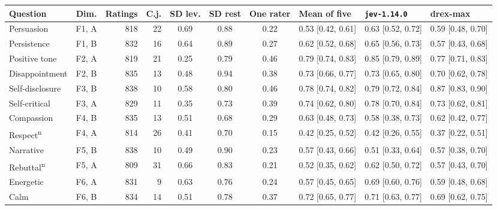 {\scriptsize\setlength{\tabcolsep}{2.4pt}
\begin{tabular}{@{}l c rr cc c l l l@{}}
\toprule
Question & Dim. & Ratings & C.j. & SD lev. & SD rest & One rater & Mean of five & \texttt{jev-1.14.0} & drex-max \\
\midrule
Persuasion & F1, A & 818 & 22 & 0.69 & 0.88 & 0.22 & 0.53 {\scriptsize[0.42, 0.61]} & 0.63 {\scriptsize[0.52, 0.72]} & 0.59 {\scriptsize[0.48, 0.70]} \\
Persistence & F1, B & 832 & 16 & 0.64 & 0.89 & 0.27 & 0.62 {\scriptsize[0.52, 0.68]} & 0.65 {\scriptsize[0.56, 0.73]} & 0.57 {\scriptsize[0.43, 0.68]} \\
Positive tone & F2, A & 819 & 21 & 0.25 & 0.79 & 0.46 & 0.79 {\scriptsize[0.74, 0.83]} & 0.85 {\scriptsize[0.79, 0.89]} & 0.77 {\scriptsize[0.71, 0.83]} \\
Disappointment & F2, B & 835 & 13 & 0.48 & 0.94 & 0.38 & 0.73 {\scriptsize[0.66, 0.77]} & 0.73 {\scriptsize[0.65, 0.80]} & 0.70 {\scriptsize[0.62, 0.78]} \\
Self-disclosure & F3, B & 838 & 10 & 0.58 & 0.80 & 0.46 & 0.78 {\scriptsize[0.74, 0.82]} & 0.79 {\scriptsize[0.72, 0.84]} & 0.87 {\scriptsize[0.83, 0.90]} \\
Self-critical & F3, A & 829 & 11 & 0.35 & 0.73 & 0.39 & 0.74 {\scriptsize[0.62, 0.80]} & 0.78 {\scriptsize[0.70, 0.84]} & 0.73 {\scriptsize[0.62, 0.81]} \\
Compassion & F4, B & 835 & 13 & 0.51 & 0.68 & 0.29 & 0.63 {\scriptsize[0.48, 0.73]} & 0.58 {\scriptsize[0.38, 0.73]} & 0.62 {\scriptsize[0.42, 0.77]} \\
Respect\textsuperscript{n} & F4, A & 814 & 26 & 0.41 & 0.70 & 0.15 & 0.42 {\scriptsize[0.25, 0.52]} & 0.42 {\scriptsize[0.26, 0.55]} & 0.37 {\scriptsize[0.22, 0.51]} \\
Narrative & F5, B & 838 & 10 & 0.49 & 0.90 & 0.23 & 0.57 {\scriptsize[0.43, 0.66]} & 0.51 {\scriptsize[0.33, 0.64]} & 0.57 {\scriptsize[0.38, 0.70]} \\
Rebuttal\textsuperscript{n} & F5, A & 809 & 31 & 0.66 & 0.83 & 0.21 & 0.52 {\scriptsize[0.35, 0.62]} & 0.62 {\scriptsize[0.50, 0.72]} & 0.57 {\scriptsize[0.43, 0.70]} \\
Energetic & F6, A & 831 & 9 & 0.63 & 0.76 & 0.24 & 0.57 {\scriptsize[0.45, 0.65]} & 0.69 {\scriptsize[0.60, 0.76]} & 0.59 {\scriptsize[0.48, 0.68]} \\
Calm & F6, B & 834 & 14 & 0.51 & 0.78 & 0.37 & 0.72 {\scriptsize[0.65, 0.77]} & 0.71 {\scriptsize[0.63, 0.77]} & 0.69 {\scriptsize[0.62, 0.75]} \\

\end{tabular}}
